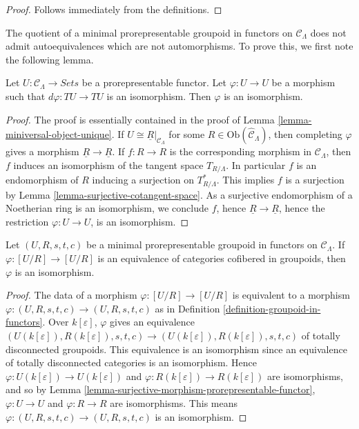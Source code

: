\begin{proof}
Follows immediately from the definitions.
\end{proof}

\noindent
The quotient of a minimal prorepresentable groupoid in functors on $\mathcal 
C_\Lambda$ does not admit autoequivalences which are not automorphisms.  To 
prove this, we first note the following lemma.

\begin{lemma}
\label{lemma-surjective-morphism-prorepresentable-functor}
Let $U: \mathcal{C}_\Lambda \to \textit{Sets}$ be a 
prorepresentable functor.  Let $\varphi: U \to U$ be a morphism such 
that $d\varphi: TU \to TU$ is an isomorphism.  Then $\varphi$ is an 
isomorphism.
\end{lemma}

\begin{proof}
The proof is essentially contained in the proof of Lemma 
\ref{lemma-miniversal-object-unique}. If $U \cong \underline{R}|_{\mathcal 
C_\Lambda}$ for some $R \in \text{Ob}(\widehat{\mathcal{C}}_\Lambda)$, 
then completing $\varphi$ gives a morphism $\underline{R} \to 
\underline{R}$.  If $f: R \to R$ is the corresponding morphism in 
$\mathcal{C}_\Lambda$, then $f$ induces an isomorphism of the tangent space 
$T_{R/\Lambda}$.  In particular $f$ is an endomorphism of $R$ inducing a 
surjection on $T^*_{R/\Lambda}$.  This implies $f$ is a surjection by Lemma 
\ref{lemma-surjective-cotangent-space}. As a surjective endomorphism of a 
Noetherian ring is an isomorphism, we conclude $f$, hence $\underline{R} 
\to \underline{R}$, hence the restriction $\varphi: U \to U$, 
is an isomorphism.
\end{proof}

\begin{lemma}
\label{lemma-minimal-prorepresentable-groupoid-autoequivalence}
Let $(U,R,s,t,c)$ be a minimal prorepresentable groupoid in functors on 
$\mathcal{C}_\Lambda$.  If $\varphi: [U/R] \to [U/R]$ is an 
equivalence of categories cofibered in groupoids, then $\varphi$ is an 
isomorphism.
\end{lemma}

\begin{proof}
The data of a morphism $\varphi: [U/R] \to [U/R]$ is equivalent to a 
morphism $\varphi: (U,R,s,t,c) \to (U,R,s,t,c)$ as in Definition 
\ref{definition-groupoid-in-functors}.  Over $k[\varepsilon]$, $\varphi$ gives 
an equivalence $(U(k[\varepsilon]),R(k[\varepsilon]), s,t,c) \to 
(U(k[\varepsilon]),R(k[\varepsilon]), s,t,c)$ of totally disconnected 
groupoids.  This equivalence is an isomorphism since an equivalence of totally 
disconnected categories is an isomorphism. Hence $\varphi: U(k[\varepsilon]) 
\to U(k[\varepsilon])$ and $\varphi: R(k[\varepsilon]) \to 
R(k[\varepsilon])$ are isomorphisms, and so by Lemma 
\ref{lemma-surjective-morphism-prorepresentable-functor}, $\varphi: U 
\to U$ and $\varphi: R \to R$ are isomorphisms.  This means 
$\varphi: (U,R,s,t,c) \to (U,R,s,t,c)$ is an isomorphism.
\end{proof}

